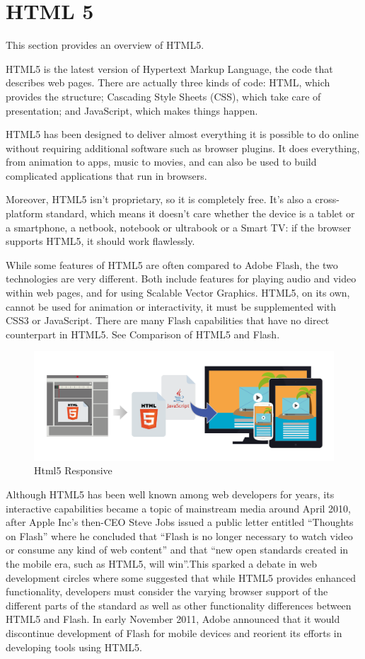 \section{HTML 5}
\label{sec:TCH_html5}

This section provides an overview of HTML5.

HTML5 is the latest version of Hypertext Markup Language, the code that describes web pages. There are actually three kinds of code: HTML, which provides the structure; Cascading Style Sheets (CSS), which take care of presentation; and JavaScript, which makes things happen.

HTML5 has been designed to deliver almost everything it is possible to do online without requiring additional software such as browser plugins. It does everything, from animation to apps, music to movies, and can also be used to build  complicated applications that run in browsers.

Moreover, HTML5 isn't proprietary, so it is completely free. It's also a cross-platform standard, which means it doesn't care whether the device is  a tablet or a smartphone, a netbook, notebook or ultrabook or a Smart TV: if the browser supports HTML5, it should work flawlessly. 

While some features of HTML5 are often compared to Adobe Flash, the two technologies are very different. Both include features for playing audio and video within web pages, and for using Scalable Vector Graphics. HTML5, on its own, cannot be used for animation or interactivity, it must be supplemented with CSS3 or JavaScript. There are many Flash capabilities that have no direct counterpart in HTML5. See Comparison of HTML5 and Flash.

\begin {figure}[h]
\graphicspath{{images/chapter_TCH/}}
\includegraphics[width=\textwidth]{html5_1}
\caption{Html5 Responsive}
\end {figure}

Although HTML5 has been well known among web developers for years, its interactive capabilities became a topic of mainstream media around April 2010, after Apple Inc's then-CEO Steve Jobs issued a public letter entitled ``Thoughts on Flash'' where he concluded that ``Flash is no longer necessary to watch video or consume any kind of web content'' and that ``new open standards created in the mobile era, such as HTML5, will win''.This sparked a debate in web development circles where some suggested that while HTML5 provides enhanced functionality, developers must consider the varying browser support of the different parts of the standard as well as other functionality differences between HTML5 and Flash. In early November 2011, Adobe announced that it would discontinue development of Flash for mobile devices and reorient its efforts in developing tools using HTML5.
